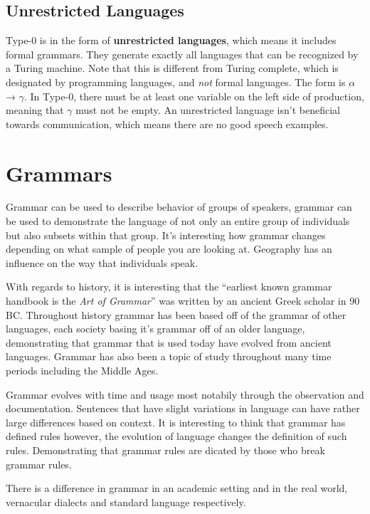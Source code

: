 \documentclass{article}
\begin{document}
\subsection{Unrestricted Languages} 

Type-0 is in the form of \textbf{unrestricted languages}, which means it includes  formal grammars. They generate exactly all languages that can be recognized by a 
Turing machine. Note that this is different from Turing complete, which is designated by programming languages, and \textit{not} formal languages. The form is $\alpha$→ $\gamma$. 
In Type-0, there must be at least one variable on the left side of production, meaning that $\gamma$ must not be empty. An unrestricted language isn't beneficial towards 
communication, which means there are no good speech examples.


\section{Grammars}

\medskip

Grammar can be used to describe behavior of groups of speakers, grammar can be used to demonstrate the language of not only an
entire group of individuals but also subsets within that group. It's interesting how grammar changes depending on what sample 
of people you are looking at. Geography has an influence on the way that individuals speak.

With regards to history, it is interesting that the ``earliest known grammar handbook is the \textit{Art of Grammar}'' was written
by an ancient Greek scholar in 90 BC. Throughout history grammar has been based off of the grammar of other languages, each society
basing it's grammar off of an older language, demonstrating that grammar that is used today have evolved from ancient languages.
Grammar has also been a topic of study throughout many time periods including the Middle Ages.

Grammar evolves with time and usage most notabily through the observation and documentation. Sentences that have slight variations in
language can have rather large differences based on context. It is interesting to think that grammar has defined rules however, the 
evolution of language changes the definition of such rules. Demonstrating that grammar rules are dicated by those who break grammar 
rules. 

There is a difference in grammar in an academic setting and in the real world, vernacular dialects and standard language respectively.
\end{document}

